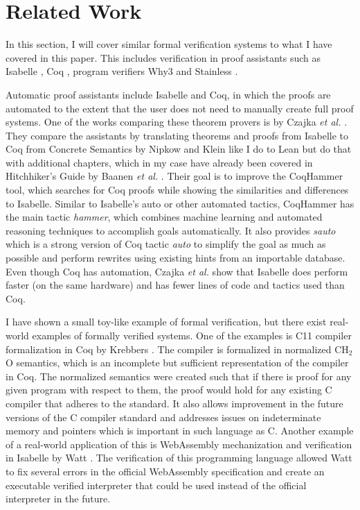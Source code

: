 \chapter{Related Work}\label{s:related}

In this section, I will cover similar formal verification systems to what I have covered in this paper. This includes verification in proof assistants such as Isabelle \cite{isabelle, webasm}, Coq \cite{coq_concrete_semantics, coq_c}, program verifiers Why3 \cite{why3} and Stainless \cite{stainless}.  

Automatic proof assistants include Isabelle and Coq, in which the proofs are automated to the extent that the user does not need to manually create full proof systems. One of the works comparing these theorem provers is by Czajka \emph{et al.} \cite{coq_concrete_semantics}. They compare the assistants by translating theorems and proofs from Isabelle to Coq from Concrete Semantics by Nipkow and Klein \cite{isabelle} like I do to Lean but do that with additional chapters, which in my case have already been covered in Hitchhiker's Guide by Baanen \emph{et al.} \cite{hithchiker}. Their goal is to improve the CoqHammer tool, which searches for Coq proofs while showing the similarities and differences to Isabelle. Similar to Isabelle's auto or other automated tactics, CoqHammer has the main tactic \emph{hammer}, which combines machine learning and automated reasoning techniques to accomplish goals automatically. It also provides \emph{sauto} which is a strong version of Coq tactic \emph{auto} to simplify the goal as much as possible and perform rewrites using existing hints from an importable database. Even though Coq has automation, Czajka \emph{et al.} \cite{coq_concrete_semantics} show that Isabelle does perform faster (on the same hardware) and has fewer lines of code and tactics used than Coq. 

I have shown a small toy-like example of formal verification, but there exist real-world examples of formally verified systems. One of the examples is C11 compiler formalization in Coq by Krebbers \cite{coq_c}. The compiler is formalized in normalized CH$_2$O semantics, which is an incomplete but sufficient representation of the compiler in Coq. The normalized semantics were created such that if there is proof for any given program with respect to them, the proof would hold for any existing C compiler that adheres to the standard. It also allows improvement in the future versions of the C compiler standard and addresses issues on indeterminate memory and pointers which is important in such language as C. Another example of a real-world application of this is WebAssembly mechanization and verification in Isabelle by Watt \cite{webasm}. The verification of this programming language allowed Watt to fix several errors in the official WebAssembly specification and create an executable verified interpreter that could be used instead of the official interpreter in the future.

